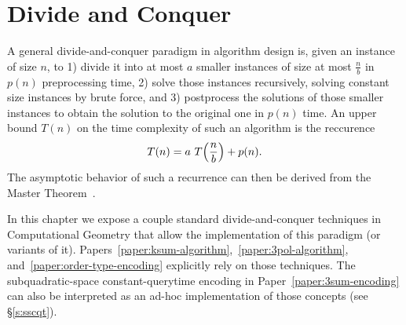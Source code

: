 \chapter{Divide and Conquer}%
\label{chapter:divide-and-conquer}

A general divide-and-conquer paradigm in algorithm design is,
given an instance of size \(n\), to 1) divide it into at most
\(a\) smaller instances of size at most \(\frac{n}{b}\) in \(p(n)\)
preprocessing time, 2) solve those instances recursively,
solving constant size instances by brute force, and 3) postprocess the
solutions of those smaller instances to obtain the solution to the original
one in \(p(n)\) time.
%
An upper bound \(T(n)\) on the time complexity of such an algorithm is the
reccurence
\begin{displaymath}
	T(n) = a \,\, T\mleft(\frac nb\mright) + p(n).
\end{displaymath}
%
The asymptotic behavior of such a recurrence can then be derived from the
Master Theorem~\cite{BHS80,CLRS09}.

In this chapter we expose a couple standard divide-and-conquer techniques in
Computational Geometry that allow the implementation of this paradigm (or
variants of it).
%
Papers~\ref{paper:ksum-algorithm},~\ref{paper:3pol-algorithm},
and~\ref{paper:order-type-encoding} explicitly rely on those techniques.
%
The subquadratic-space constant-querytime encoding in
Paper~\ref{paper:3sum-encoding} can also be interpreted as an ad-hoc
implementation of those concepts (see \S\ref{s:sscqt}).




